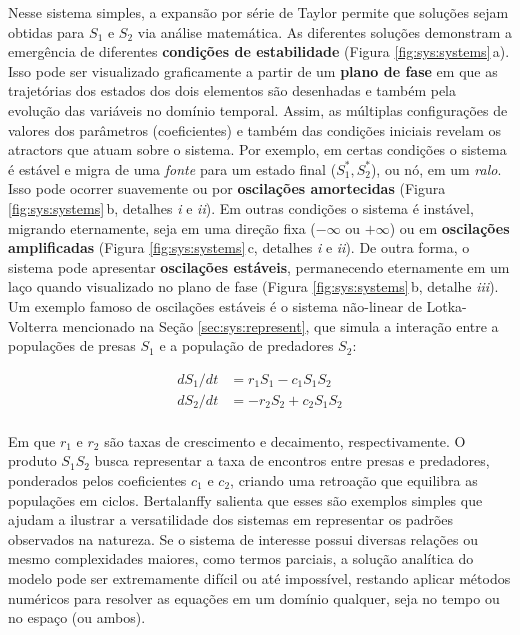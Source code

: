 \documentclass[./main.tex]{subfiles}
\begin{document}
Nesse sistema simples, a expansão por série de Taylor permite que soluções sejam obtidas para $S_1$ e $S_2$ via análise matemática. As diferentes soluções demonstram a emergência de diferentes \textbf{condições de estabilidade} (Figura \ref{fig:sys:systems}\,a). Isso pode ser visualizado graficamente a partir de um \textbf{plano de fase} em que as trajetórias dos estados dos dois elementos são desenhadas e também pela evolução das variáveis no domínio temporal. Assim, as múltiplas configurações de valores dos parâmetros (coeficientes) e também das condições iniciais revelam os \gls{atractors} que atuam sobre o sistema. Por exemplo, em certas condições o sistema é estável e migra de uma \textit{fonte} para um estado final ($S^*_1, S^*_2$), ou nó, em um \textit{ralo}. Isso pode ocorrer suavemente ou por \textbf{oscilações amortecidas} (Figura \ref{fig:sys:systems}\,b, detalhes \textrm{\textit{i}} e \textrm{\textit{ii}}). Em outras condições o sistema é instável, migrando eternamente, seja em uma direção fixa ($-\infty$ ou $+\infty$) ou em \textbf{oscilações amplificadas} (Figura \ref{fig:sys:systems}\,c, detalhes \textrm{\textit{i}} e \textrm{\textit{ii}}). De outra forma, o sistema pode apresentar \textbf{oscilações estáveis}, permanecendo eternamente em um laço quando visualizado no plano de fase (Figura \ref{fig:sys:systems}\,b, detalhe \textrm{\textit{iii}}). Um exemplo famoso de oscilações estáveis é o sistema não-linear de Lotka-Volterra mencionado na Seção \ref{sec:sys:represent}, que simula a interação entre a populações de presas $S_1$ e a população de predadores $S_2$:
\begin{linenomath*}
\[
\begin{split}
    dS_1/dt &= r_{1}S_1 - c_{1}S_1S_2\\
    dS_2/dt &= -r_{2}S_2 + c_{2}S_1S_2\\
\end{split}
\]
\end{linenomath*}
Em que $r_1$ e $r_2$ são taxas de crescimento e decaimento, respectivamente. O produto $S_1S_2$ busca representar a taxa de encontros entre presas e predadores, ponderados pelos coeficientes $c_1$ e $c_2$, criando uma retroação que equilibra as populações em ciclos. Bertalanffy salienta que esses são exemplos simples que ajudam a ilustrar a versatilidade dos sistemas em representar os padrões observados na natureza. Se o sistema de interesse possui diversas relações ou mesmo complexidades maiores, como termos parciais, a solução analítica do modelo pode ser extremamente difícil ou até impossível, restando aplicar métodos numéricos para resolver as equações em um domínio qualquer, seja no tempo ou no espaço (ou ambos).
\end{document}
